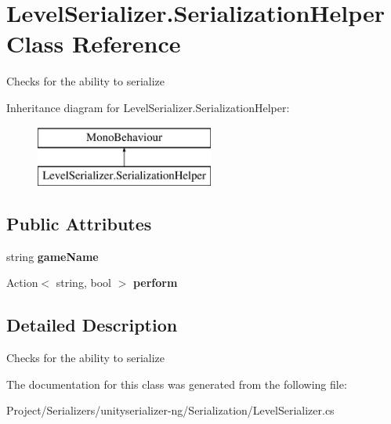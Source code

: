 \hypertarget{class_level_serializer_1_1_serialization_helper}{}\section{Level\+Serializer.\+Serialization\+Helper Class Reference}
\label{class_level_serializer_1_1_serialization_helper}


Checks for the ability to serialize  


Inheritance diagram for Level\+Serializer.\+Serialization\+Helper\+:\begin{figure}[H]
\begin{center}
\leavevmode
\includegraphics[height=2.000000cm]{class_level_serializer_1_1_serialization_helper}
\end{center}
\end{figure}
\subsection*{Public Attributes}
\begin{DoxyCompactItemize}
\item 
\mbox{\label{class_level_serializer_1_1_serialization_helper_a96770e144e0d3109da4f1abc6e80809b}} 
string {\bfseries game\+Name}
\item 
\mbox{\label{class_level_serializer_1_1_serialization_helper_aa9def6ef5a0e2192b40464483a8ea057}} 
Action$<$ string, bool $>$ {\bfseries perform}
\end{DoxyCompactItemize}


\subsection{Detailed Description}
Checks for the ability to serialize 



The documentation for this class was generated from the following file\+:\begin{DoxyCompactItemize}
\item 
Project/\+Serializers/unityserializer-\/ng/\+Serialization/Level\+Serializer.\+cs\end{DoxyCompactItemize}
